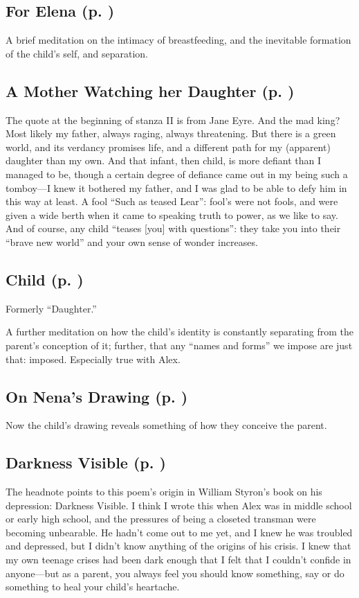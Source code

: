 \subsection*{For Elena (p. \pageref{ch:forelena})}
A brief meditation on the intimacy of breastfeeding, and the inevitable formation of the child's self, and separation.

\subsection*{A Mother Watching her Daughter (p. \pageref{ch:amotherwatching})}
The quote at the beginning of stanza II is from Jane Eyre. And the mad king?
Most likely my father, always raging, always threatening. But there is a green
world, and its verdancy promises life, and a different path for my (apparent)
daughter than my own. And that infant, then child, is more defiant than I
managed to be, though a certain degree of defiance came out in my being such a
tomboy---I knew it bothered my father, and I was glad to be able to defy him in
this way at least. A fool ``Such as teased Lear'': fool's were not fools, and
were given a wide berth when it came to speaking truth to power, as we like to
say. And of course, any child ``teases [you] with questions'': they take you
into their ``brave new world'' and your own sense of wonder increases.

\subsection*{Child (p. \pageref{ch:child})}
Formerly ``Daughter.''

A further meditation on how the child's identity is
constantly separating from the parent's conception of it; further, that any
``names and forms'' we impose are just that: imposed. Especially true with Alex.

\subsection*{On Nena's Drawing (p. \pageref{ch:onnena})}
Now the child's drawing reveals something of how they conceive the parent.

\subsection*{Darkness Visible (p. \pageref{ch:darknessvisible})}
The headnote points to this poem's origin in William Styron's book on his
depression: Darkness Visible. I think I wrote this when Alex was in middle
school or early high school, and the pressures of being a closeted transman were
becoming unbearable. He hadn't come out to me yet, and I knew he was troubled
and depressed, but I didn't know anything of the origins of his crisis. I knew
that my own teenage crises had been dark enough that I felt that I couldn't
confide in anyone---but as a parent, you always feel you should know something,
say or do something to heal your child's heartache.

